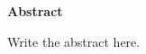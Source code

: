 \begin{center}
\LARGE\textbf {Abstract}
\end{center}
\vspace{1cm}

\begin{spacing}{1} 
\noindent
Write the abstract here.


\end{spacing}